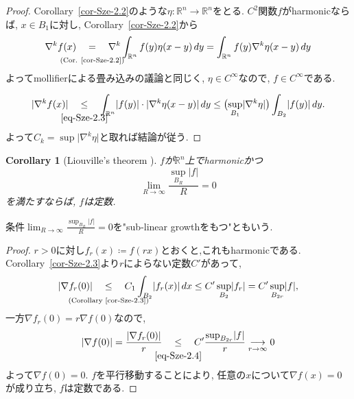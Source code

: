 \documentclass[dvipdfmx,a4paper,11pt]{article} %
\newtheorem{cor}[thm]{Corollary}
\theoremstyle{definition}
\theoremstyle{remark}
\numberwithin{equation}{section}
\newcommand{\underalign}[2]{%
  \quad
  \underset{\mathclap{\raisebox{-1.6ex}{\ensuremath{\scriptstyle #1}}}}{#2}
  \quad
}
\newcommand{\R}{\mathbb{R}}
\begin{document}
\begin{proof}
Corollary~\ref{cor-Sze-2.2}のような$\eta \colon \R^n \to \R^n$をとる. 
$C^2$関数$f$がharmonicならば, 
 $x\in B_1$に対し, Corollary~\ref{cor-Sze-2.2}から
 \begin{equation}
\label{eq-Sze-2.3}
\nabla^k f(x)
\underalign{\text{(Cor. \ref{cor-Sze-2.2})}}{=}
\nabla^k \int_{\mathbb{R}^n} f(y)\eta(x-y)\,dy
=
\int_{\mathbb{R}^n} f(y)\nabla^k\eta(x-y)\,dy
\end{equation}
よってmollifierによる畳み込みの議論と同じく, $\eta \in C^{\infty}$なので, $f \in C^\infty$である. 

\[
\lvert\nabla^k f(x)\rvert
\underalign{\eqref{eq-Sze-2.3}}{\leq}
\int_{\mathbb{R}^n} \lvert f(y)\rvert \cdot \lvert\nabla^k\eta(x-y)\rvert\,dy
\leq\bigl(\sup_{B_1}\lvert\nabla^k\eta\rvert\bigr)\int_{B_2}\lvert f(y)\rvert\,dy.
\]
よって$C_k=\sup\lvert\nabla^k\eta\rvert$と取れば結論が従う.
\end{proof}


\begin{cor}
[Liouville's theorem {\cite[Corollary 2.4]{Sze14}}]
\label{cor-Sze-2.4}
 $f$が$\mathbb{R}^n$上でharmonicかつ
 \[
\lim_{R\to\infty} \frac{\sup_{B_R}\lvert f\rvert}{R}=0
\]
を満たすならば, $f$は定数. 
\end{cor}
条件$\lim_{R\to\infty} \frac{\sup_{B_R}\lvert f\rvert}{R}=0$を"sub-linear growthをもつ"ともいう. 

\begin{proof}

$r>0$に対し$f_r(x) \coloneqq f(rx)$とおくと,これもharmonicである. 
Corollary~\ref{cor-Sze-2.3}より$r$によらない定数$C'$があって, 
\begin{equation}
\label{eq-Sze-2.4}
\lvert\nabla f_r(0)\rvert
\underalign{\text{(Corollary~\ref{cor-Sze-2.3})}}{ \leq }
C_1\int_{B_2} \lvert f_r(x)\rvert\,dx \leq C'\sup_{B_2}\lvert f_r\rvert=C'\sup_{B_{2r}}\lvert f\rvert,
\end{equation}
一方$\nabla f_r(0)=r\nabla f(0)$なので,
\[
\lvert\nabla f(0)\rvert
=\frac{\lvert\nabla f_r(0)\rvert}{r}
\underalign{\eqref{eq-Sze-2.4}}{\leq} C' \frac{\sup_{B_{2r}}\lvert f\rvert}{r}  \underset{r \to \infty}{\longrightarrow} 0
\]
よって$\nabla f(0)=0$. $f$を平行移動することにより, 任意の$x$について$\nabla f(x)=0$が成り立ち, $f$は定数である. 
\end{proof}
\end{document}

